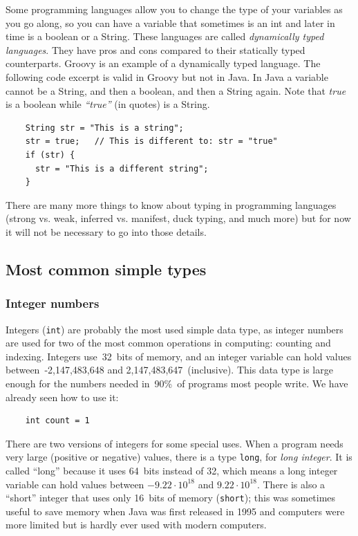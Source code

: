 Some programming languages allow you to change the type of your
variables as you go along, so you can have a variable that sometimes
is an int and later in time is a boolean or a String. These languages
are called \emph{dynamically typed languages}. They have pros and cons
compared to their statically typed counterparts. Groovy is an example
of a dynamically typed language. The following code excerpt is valid
in Groovy but not in Java. In Java a variable cannot be a String, and
then a boolean, and then a String again. Note that \emph{true} is a
boolean while \emph{``true''} (in quotes) is a String. 

\begin{verbatim}
    String str = "This is a string";
    str = true;   // This is different to: str = "true"
    if (str) {
      str = "This is a different string";
    }
\end{verbatim}

There are many more things to know about typing in programming
languages (strong vs. weak, inferred vs. manifest, duck typing, and
much more) but for now it will not be necessary to go into those
details. 

\subsection{Most common simple types}
\label{sec:most-common-simple}

\subsubsection{Integer numbers}
\label{sec:integers}

Integers (\verb+int+) are probably the most used simple data type, as
integer numbers are used for two of the most common operations in
computing: counting and indexing. Integers use~32~bits of memory, and
an integer variable can hold values between~-2,147,483,648 and
2,147,483,647~(inclusive). This data type is large enough for the
numbers needed in~90\%~of programs most people write. We have already
seen how to use it: 

\begin{verbatim}
    int count = 1
\end{verbatim}

There are two versions of integers for some special uses. When a
program needs very large (positive or negative) values, there is a
type \verb+long+, for \emph{long integer}. It is called ``long''
because it uses 64~bits instead of 32, which means a long integer
variable can hold values between \mbox{$-9.22 \cdot 10^{18}$} and
\mbox{$9.22 \cdot 10^{18}$}. There is also a ``short''
integer that uses only 16~bits of memory (\verb+short+); this was
sometimes useful to save memory when Java was first released in 1995
and computers were more limited but is hardly ever used with modern
computers.

